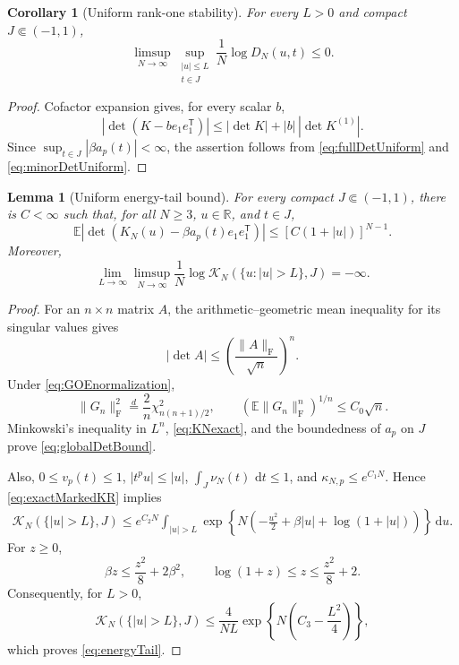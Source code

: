 \documentclass[11pt,reqno]{amsart}
\numberwithin{equation}{section}
\theoremstyle{plain}
\newtheorem{lemma}[lemma]{Lemma}
\newtheorem{corollary}[corollary]{Corollary}
\theoremstyle{definition}
\theoremstyle{remark}
\newcommand{\E}{\mathbb E}
\newcommand{\R}{\mathbb R}
\newcommand{\1}{\mathbf 1}
\newcommand{\dd}{\,\mathrm d}
\begin{document}
\begin{corollary}[Uniform rank-one stability]\label{cor:rankoneStability}
For every \(L>0\) and compact \(J\Subset(-1,1)\),
\begin{equation}\label{eq:detstability}
 \limsup_{N\to\infty}
 \sup_{\substack{|u|\leq L\\t\in J}}
 \frac1N\log D_N(u,t)\leq0.
\end{equation}
\end{corollary}

\begin{proof}
Cofactor expansion gives, for every scalar \(b\),
\[
 |\det(K-be_1e_1^{\mathsf T})|
 \leq|\det K|+|b|\,|\det K^{(1)}|.
\]
Since \(\sup_{t\in J}|\beta a_p(t)|<\infty\), the assertion follows
from \eqref{eq:fullDetUniform} and \eqref{eq:minorDetUniform}.
\end{proof}

\begin{lemma}[Uniform energy-tail bound]\label{lem:energyTail}
For every compact \(J\Subset(-1,1)\), there is \(C<\infty\) such that,
for all \(N\geq3\), \(u\in\R\), and \(t\in J\),
\begin{equation}\label{eq:globalDetBound}
 \E|\det(K_N(u)-\beta a_p(t)e_1e_1^{\mathsf T})|
 \leq[C(1+|u|)]^{N-1}.
\end{equation}
Moreover,
\begin{equation}\label{eq:energyTail}
 \lim_{L\to\infty}\limsup_{N\to\infty}\frac1N
 \log\mathcal K_N(\{u:|u|>L\},J)=-\infty.
\end{equation}
\end{lemma}

\begin{proof}
For an \(n\times n\) matrix \(A\), the arithmetic--geometric mean
inequality for its singular values gives
\[
 |\det A|\leq\left(\frac{\|A\|_{\mathrm F}}{\sqrt n}\right)^n.
\]
Under \eqref{eq:GOEnormalization},
\[
 \|G_n\|_{\mathrm F}^2\stackrel d=\frac2n
 \chi^2_{n(n+1)/2},
 \qquad
 \left(\E\|G_n\|_{\mathrm F}^n\right)^{1/n}\leq C_0\sqrt n.
\]
Minkowski's inequality in \(L^n\), \eqref{eq:KNexact}, and the boundedness
of \(a_p\) on \(J\) prove \eqref{eq:globalDetBound}.

Also, \(0\leq v_p(t)\leq1\), \(|t^pu|\leq|u|\),
\(\int_J\nu_N(t)\,\dd t\leq1\), and
\(\kappa_{N,p}\leq e^{C_1N}\).  Hence \eqref{eq:exactMarkedKR} implies
\begin{align*}
 \mathcal K_N(\{|u|>L\},J)
 \leq e^{C_2N}\int_{|u|>L}
 \exp\left\{N\left(-\frac{u^2}{2}+\beta|u|
 +\log(1+|u|)\right)\right\}\dd u.
\end{align*}
For \(z\geq0\),
\[
 \beta z\leq\frac{z^2}{8}+2\beta^2,
 \qquad
 \log(1+z)\leq z\leq\frac{z^2}{8}+2.
\]
Consequently, for \(L>0\),
\begin{equation}\label{eq:explicitTail}
 \mathcal K_N(\{|u|>L\},J)
 \leq\frac4{NL}\exp\left\{N\left(C_3-\frac{L^2}{4}\right)\right\},
\end{equation}
which proves \eqref{eq:energyTail}.
\end{proof}
\end{document}
